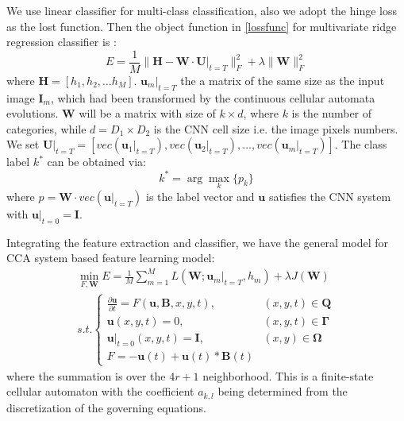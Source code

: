 \documentclass{amsart}
\theoremstyle{definition}
\theoremstyle{remark}
\numberwithin{equation}{section}
\begin{document}
We use linear classifier for multi-class classification, also we adopt the hinge loss as the lost function.
Then the object function in \ref{lossfunc} for multivariate ridge regression classifier is :
\begin{equation}
E = \frac{1}{M}\lVert \mathbf{H} - \mathbf{W} \cdot \mathbf{U}|_{t=T} \rVert_F^2 + \lambda \lVert \mathbf{W} \rVert_F^2
\end{equation}
where $\mathbf{H} = [h_1, h_2, \dots h_M]$.
$\mathbf{u}_m|_{t=T}$ the a matrix of the same size as the input image $\mathbf{I}_m$, which had been transformed by the continuous cellular automata evolutions. $\mathbf{W}$ will be a matrix with size of $k \times d$, where  $k$ is the number of categories, while $d = D_1 \times D_2$ is the CNN cell size i.e. the image pixels numbers.
We set $\mathbf{U}|_{t=T} = [vec(\mathbf{u}_1|_{t=T}), vec(\mathbf{u}_2|_{t=T}), \dots, vec(\mathbf{u}_m|_{t=T})]$. The class label $k^*$ can be obtained via:
\begin{equation}
k^* = \arg \max_k\{p_k\}
\end{equation}
where $p = \mathbf{W} \cdot vec(\mathbf{u}|_{t=T})$ is the label vector and $\mathbf{u}$ satisfies the CNN system with $\mathbf{u}|_{t = 0} = \mathbf{I}$.

Integrating the feature extraction and classifier, we have the general model for CCA system based feature learning model:
\begin{equation}
\begin{split}
\min_{F, \mathbf{W}} E = \frac{1}{M} \sum_{m=1}^M L(\mathbf{W}; \mathbf{u}_m|_{t=T}, h_m) + \lambda J(\mathbf{W}) \\
s.t.    \begin{cases}
    \frac{\partial \mathbf{u}}{\partial t} = F(\mathbf{u},  \mathbf{B}, x, y, t), &  (x, y, t) \in \mathbf{Q}\\
	\mathbf{u}(x, y, t) = 0, & (x, y, t) \in  \mathbf{\Gamma} \\
	\mathbf{u}|_{t=0}(x, y, t) = \mathbf{I}, & (x, y)\in \mathbf{\Omega} \\
	F = -  \mathbf{u}(t)  + \mathbf{u}(t) * \mathbf{B}(t)
  \end{cases} 
\end{split}
\end{equation}
where the summation is over the $4r + 1$ neighborhood.
This is a finite-state cellular automaton with the coefficient $a_{k, l}$ being determined from the discretization of the governing equations.
\end{document}
